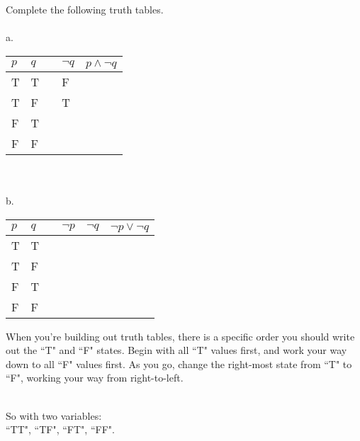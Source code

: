     \begin{questionNOGRADE}{\thequestion}
        Complete the following truth tables. ~\\
        
        ~\\
        a.
        \begin{tabular}{ | p{1cm} | p{1cm} | c | p{2cm} | p{3cm} | }
            \hline
            $p$ & $q$ & & $\neg q$ & $p \land \neg q$ \\ \hline
            T & T & & F & \\ \hline
            T & F & & T & \\ \hline
            F & T & &  & \\ \hline
            F & F & &  & \\ \hline
        \end{tabular}

        ~\\~\\
        b.
        \begin{tabular}{ | p{1cm} | p{1cm} | c | p{2cm} | p{2cm} | p{3cm} | }
            \hline
            $p$ & $q$ & & $\neg p$ & $\neg q$ & $\neg p \lor \neg q$ \\ \hline
            T & T & & & & \\ \hline
            T & F & & & & \\ \hline
            F & T & & & & \\ \hline
            F & F & & & & \\ \hline
        \end{tabular}
    \end{questionNOGRADE}

    \newpage
    \begin{introNOHEAD}{}
        When you're building out truth tables, there is a specific order
        you should write out the ``T" and ``F" states.
        Begin with all ``T" values first, and work your way down to
        all ``F" values first. As you go, change the right-most state
        from ``T" to ``F", working your way from right-to-left.

        ~\\
        So with two variables: \\ ``TT", ``TF", ``FT", ``FF".
    \end{introNOHEAD}
    
